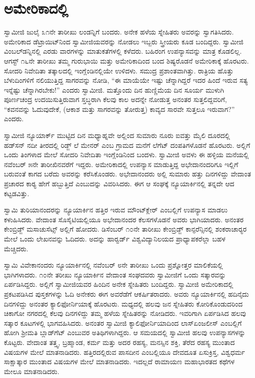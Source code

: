 
\chapter{ಅಮೇರಿಕಾದಲ್ಲಿ}

 ಸ್ವಾಮೀಜಿ ಜುಲೈ ೩೧ನೇ ತಾರೀಖು ಲಂಡನ್ನಿಗೆ ಬಂದರು. ಅನೇಕ ಹಳೆಯ ಸ್ನೇಹಿತರು ಅವರನ್ನು ಸ್ವಾಗತಿಸಿದರು. ಅಮೇರಿಕಾದ ಡೆಟ್ರಾಯಿಟ್‍ನಿಂದ ಸ್ವಾಮೀಜಿಯವರನ್ನು ನೋಡಲು ಇಬ್ಬರು ಸ್ತ್ರೀಯರು ಕೂಡ ಬಂದಿದ್ದರು. ಸ್ವಾಮೀಜಿ ವಿಂಬಲ್‍ಡನ್ನಿನಲ್ಲಿ ಎರಡು ವಾರಗಳನ್ನು ಮಾತುಕತೆಗಳಲ್ಲಿ ಕಳೆದರು. ಬಹಿರಂಗ ಉಪನ್ಯಾಸವನ್ನು ಮಾತ್ರ ಕೊಡಲಿಲ್ಲ. ಆಗಸ್ಟ್ ೧೬ನೇ ತಾರೀಖು ತಮ್ಮ ಗುರುಭಾಯಿ ಮತ್ತು ಅಮೇರಿಕಾದಿಂದ ಬಂದ ಶಿಷ್ಯರೊಡನೆ ಅಮೇರಿಕಾಕ್ಕೆ ಹೊರಟರು. ಸೋದರಿ ನಿವೇದಿತಾ ತತ್ಕಾಲದಲ್ಲಿ ಇಂಗ್ಲೆಂಡಿನಲ್ಲಿಯೇ ಉಳಿದಳು. ಸಮುದ್ರ ಪ್ರಶಾಂತವಾಗಿತ್ತು. ರಾತ್ರಿಯ ಹೊತ್ತು ಬೆಳುದಿಂಗಳಿಗೆ ನಲಿಯುತ್ತಿದ್ದ ಸಾಗರವನ್ನು ನೋಡಿ, “ಈ ಮಾಯೆಯೇ ಇಷ್ಟು ಚೆನ್ನಾಗಿದ್ದರೆ ಇದರ ಹಿಂದೆ ಇರುವ ಸತ್ಯ ಇನ್ನೆಷ್ಟು ಚೆನ್ನಾಗಿರಬೇಕು!” ಎಂದರು ಸ್ವಾಮೀಜಿ. ಮತ್ತೊಂದು ದಿನ ಹುಣ್ಣಿಮೆಯ ದಿನ ಸೂರ್ಯ ಮುಳುಗಿ ಪೂರ್ಣಚಂದ್ರ ಉದಯಿಸುತ್ತಿರುವಾಗ ಸ್ತಬ್ಧರಾಗಿ ಕೆಲವು ಕಾಲ ಅದನ್ನೇ ನೋಡುತ್ತ ಅನಂತರ ಸುತ್ತಲಿದ್ದವರಿಗೆ, “ಕವನವನ್ನು ಓದುವುದೇಕೆ, (ಆಕಾಶ ಮತ್ತು ಸಾಗರವನ್ನು ತೋರುತ್ತ) ಕಾವ್ಯದ ಸಾರವೇ ಸುತ್ತಲೂ ಇರುವಾಗ?” ಎಂದರು. 

 ಸ್ವಾಮೀಜಿ ನ್ಯೂಯಾರ್ಕ್ ಮುಟ್ಟಿದ ದಿನ ಮಧ್ಯಾಹ್ನವೇ ಅಲ್ಲಿಂದ ಸುಮಾರು ನೂರು ಐವತ್ತು ಮೈಲಿ ದೂರದಲ್ಲಿ ಹಡ್‍ಸನ್ ನದೀ ತೀರದಲ್ಲಿ ರಿಡ್ಜ್ ಲೆ ಮೇನರ್ ಎಂಬ ಗ್ರಾಮದ ಮನೆಗೆ ಲೆಗೆಟ್ ದಂಪತಿಗಳೊಡನೆ ಹೊರಟರು. ಅಲ್ಲಿಗೆ ಒಂದು ತಿಂಗಳಾದ ಮೇಲೆ ಸೋದರಿ ನಿವೇದಿತಾ ಇಂಗ್ಲೆಂಡಿನಿಂದ ಬಂದಳು. ಸ್ವಾಮೀಜಿ ಅವಳು ಈ ಹಳ್ಳಿಯ ಮನೆಯಲ್ಲಿ ನವೆಂಬರ್ ೫ನೇ ತಾರೀಖಿನವರೆಗೆ ಇದ್ದರು. ಅಮೇರಿಕಾದಲ್ಲಿ ಉಪನ್ಯಾಸ ಮಾಡುತ್ತಿದ್ದ ಅಭೇದಾನಂದರಿಗೂ ಇಲ್ಲಿಗೆ ಬರುವಂತೆ ಕಾಗದ ಬರೆದು ಅವರನ್ನು ಕರೆಸಿಕೊಂಡರು. ಅಭೇದಾನಂದರು ಅಲ್ಲಿ ಸುಮಾರು ಹತ್ತು ದಿನಗಳಿದ್ದು ವೇದಾಂತ ಪ್ರಚಾರದ ಕಾರ‍್ಯ ಹೇಗೆ ಹಬ್ಬುತ್ತಿದೆ ಎಂಬುದನ್ನು ವಿವರಿಸಿದರು. ಈಗ ಆ ಸಂಘಕ್ಕೆ ನ್ಯೂಯಾರ್ಕಿನಲ್ಲಿ ತನ್ನದೇ ಆದ ಕಟ್ಟಡವಿತ್ತು. 

 ಸ್ವಾಮಿ ತುರಿಯಾನಂದರನ್ನು ನ್ಯೂಯಾರ್ಕಿನ ಹತ್ತಿರ ಇರುವ ಮೌಂಟ್‍ಕ್ಲೇರ್ ಎಂಬಲ್ಲಿಗೆ ಉಪನ್ಯಾಸ ಮಾಡಲು ಕಳುಹಿಸಿದರು. ವೇದಾಂತ ಸೊಸೈಟಿಯಲ್ಲಿಯೂ ಅಭೇದಾನಂದರ ಕೆಲಸಗಳೊಡನೆ ಅವರು ಭಾಗಿಯಾದರು. ಅನಂತರ ಕೇಂಬ್ರಿಡ್ಜ್ ಮಸಾಚುಸೆಟ್ಸ್ ಅಲ್ಲಿಗೆ ಹೋದರು. ಡಿಸೆಂಬರ್ ೧೦ನೇ ತಾರೀಖು ಕೇಂಬ್ರಿಡ್ಜ್ ಕಾನ್ಫರೆನ್ಸಿನಲ್ಲಿ ಶಂಕರಾಚಾರ‍್ಯರ ಮೇಲೆ ಒಂದು ಲೇಖನವನ್ನು ಓದಿದರು. ಅದನ್ನು ಹಾರ್‍ವರ್ಡ್ ವಿಶ್ವವಿದ್ಯಾನಿಲಯದ ಪ್ರಾಧ್ಯಾಪಕರೆಲ್ಲಾ ಬಹಳ ಮೆಚ್ಚಿದರು. 

 ಸ್ವಾಮಿ ವಿವೇಕಾನಂದರು ನ್ಯೂಯಾರ್ಕಿನಲ್ಲಿ ನವೆಂಬರ್ ೮ನೇ ತಾರೀಖು ಒಂದು ಪ್ರಶ್ನೋತ್ತರ ಮಾಲಿಕೆಯಲ್ಲಿ ಭಾಗಿಗಳಾದರು. ೧೦ನೇ ತರೀಖು ನ್ಯೂಯಾರ್ಕಿನ ವೇದಾಂತ ಸಂಘದವರು ಸ್ವಾಮೀಜಿಗೆ ಒಂದು ಸತ್ಕಾರವನ್ನು ಏರ್ಪಡಿಸಿದ್ದರು. ಅಲ್ಲಿಗೆ ಸ್ವಾಮೀಜಿಯವರ ಹಿಂದಿನ ಅನೇಕ ಸ್ನೇಹಿತರು ಬಂದಿದ್ದರು. ಸ್ವಾಮೀಜಿ ಅಮೇರಿಕಾದಲ್ಲಿ ಪ್ರಕಟಪಡಿಸಿದ ಪುಸ್ತಕಗಳನ್ನು ಓದಿ ಅನೇಕರು ಈಗ ಅವರೆಡೆಗೆ ಆಕರ್ಷಿತರಾದರು. ಅವರು ನ್ಯೂಯಾರ್ಕಿನಲ್ಲಿ ಹದಿನೈದು ದಿನಗಳಿದ್ದು ಅನಂತರ ಕ್ಯಾಲಿಫೋರ್ನಿಯಾಕ್ಕೆ ಹೊರಟರು. ಮಧ್ಯದಲ್ಲಿ ಹಲವು ಜನ ಸ್ನೇಹಿತರು ಕೋರಿಕೊಂಡುದರಿಂದ ಚಿಕಾಗೋ ನಗರದಲ್ಲಿ ಕೆಲವು ದಿನಗಳಿದ್ದು ತಮ್ಮ ಹಳೆಯ ಸ್ನೇಹಿತರನ್ನು ನೋಡಿದರು. ಇವರಿಗಾಗಿ ಏರ್ಪಡಿಸಿದ ಹಲವು ಸತ್ಕಾರ ಕೂಟಗಳಲ್ಲಿ ಭಾಗವಹಿಸಿದರು. ಅನಂತರ ಸ್ವಾಮೀಜಿ ಕ್ಯಾಲಿಫೋರ್ನಿಯಾದಿಂದ ಲಾಸ್‍ಏಂಜಲೀಸ್ ಎಂಬಲ್ಲಿಗೆ ಹೋಗಿ ಶ‍್ರೀಮತಿ ಬ್ಲಾಡ್‍ಗೆಟ್ ಎಂಬುವರ ಅತಿಥಿಗಳಾಗಿದ್ದರು. ಆ ಸಮಯದಲ್ಲಿ ಸ್ವಾಮೀಜಿ ಹಲವು ಉಪನ್ಯಾಸಗಳನ್ನು ಕೊಟ್ಟರು. ವೇದಾಂತ ತತ್ತ್ವ, ಬ್ರಹ್ಮಾಂಡ, ಕರ್ಮ ಮತ್ತು ಅದರ ರಹಸ್ಯ, ಮನಸ್ಸಿನ ಶಕ್ತಿ, ತೆರೆದ ರಹಸ್ಯ ಮುಂತಾದ ವಿಷಯಗಳ ಮೇಲೆ ಮಾತನಾಡಿದರು. ಹತ್ತಿರದಲ್ಲಿರುವ ಪಾಸದೀನ ಎಂಬಲ್ಲಿಯೂ ದೇವದೂತ ಏಸುಕ್ರಿಸ್ತ, ವಿಶ್ವಧರ್ಮ ಸಾಕ್ಷಾತ್ಕಾರ ಮುಂತಾದ ವಿಷಯಗಳ ಮೇಲೆ ಮಾತನಾಡಿದರು. ಇದಲ್ಲದೆ ರಾಮಾಯಣ ಮಹಾಭಾರತದ ಕಥೆಗಳ ಮೇಲೂ ಮಾತನಾಡಿದರು. 

